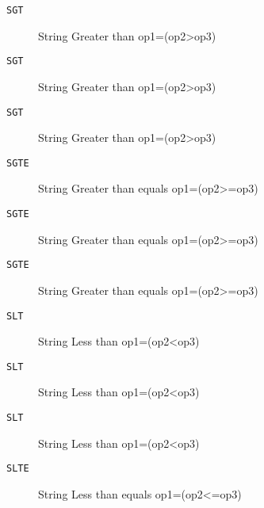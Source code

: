 \begin{description}
\item[\texttt{SGT        }]  String Greater than op1=(op2>op3)\\
\end{description}

\begin{description}
\item[\texttt{SGT        }]  String Greater than op1=(op2>op3)\\
\end{description}

\begin{description}
\item[\texttt{SGT        }]  String Greater than op1=(op2>op3)\\
\end{description}

\begin{description}
\item[\texttt{SGTE       }]  String Greater than equals op1=(op2>=op3)\\
\end{description}

\begin{description}
\item[\texttt{SGTE       }]  String Greater than equals op1=(op2>=op3)\\
\end{description}

\begin{description}
\item[\texttt{SGTE       }]  String Greater than equals op1=(op2>=op3)\\
\end{description}

\begin{description}
\item[\texttt{SLT        }]  String Less than op1=(op2<op3)\\
\end{description}

\begin{description}
\item[\texttt{SLT        }]  String Less than op1=(op2<op3)\\
\end{description}

\begin{description}
\item[\texttt{SLT        }]  String Less than op1=(op2<op3)\\
\end{description}

\begin{description}
\item[\texttt{SLTE       }]  String Less than equals op1=(op2<=op3)\\
\end{description}
